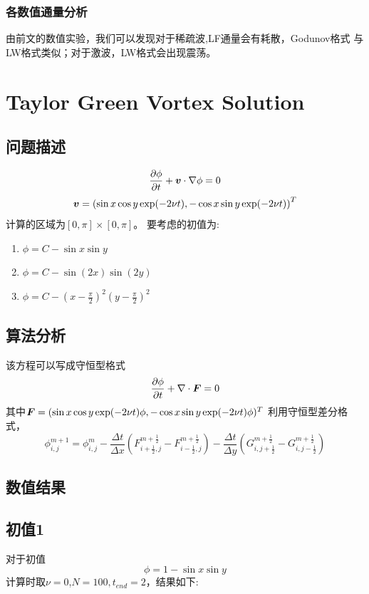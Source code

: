 \documentclass[a4paper,  11pt]{ctexart}
\newcommand\pd[2]{\dfrac{\partial {#1}}{\partial {#2}}}
\newcommand{\bm}[1]{\mbox{\boldmath{$#1$}}}
\begin{document}
\subsubsection{各数值通量分析}
由前文的数值实验，我们可以发现对于稀疏波,LF通量会有耗散，Godunov格式
与LW格式类似；对于激波，LW格式会出现震荡。
\section{Taylor Green Vortex Solution}
\subsection{问题描述}
\begin{equation}
  \pd{\phi}{t}+\bm v \cdot \nabla \phi=0
\end{equation}
\[  
  \bm v = \left( \sin x\cos y \exp(-2\nu t),-\cos x\sin y \exp(-2\nu
  t) \right)^T
\]
计算的区域为$[0,\pi]\times[0,\pi]$。
要考虑的初值为:
\begin{enumerate}
  \item $\phi=C-\sin x\sin y$
  \item $\phi=C-\sin(2x)\sin(2y)$
  \item
    $\phi=C-\left(x-\frac{\pi}{2}\right)^2\left(y-\frac{\pi}{2}\right)^2$
\end{enumerate}
\subsection{算法分析}
该方程可以写成守恒型格式
\[  
\pd{\phi}{t} + \nabla \cdot \bm{F} = 0
 \]
 其中$\bm F=(\sin x\cos y\exp(-2\nu t)\phi,
 -\cos x\sin y\exp(-2\nu
 t)\phi)^T$
 利用守恒型差分格式，
 \[ 
 \phi^{m+1}_{i,j}=\phi_{i,j}^m
 -\frac{\Delta t}{\Delta
 x}\left(F_{i+\frac 12,j}^{m+\frac 12}-F_{i-\frac 12,j}^{m+\frac
 12}\right)
 -\frac{\Delta t}{\Delta
 y}\left(G_{i,j+\frac 12}^{m+\frac 12}-G_{i,j-\frac 12}^{m+\frac
 12}\right)
 \]
\subsection{数值结果}
\subsection{初值1}
对于初值
\[  
  \phi=1-\sin x\sin y
\]
计算时取$\nu=0$,$N=100,t_{end}=2$，结果如下:
\end{document}
